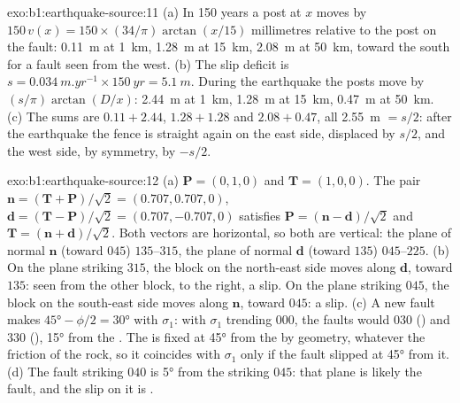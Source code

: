 \begin{solution}{exo:b1:earthquake-source:11}
(a) In 150 years a post at $x$ moves by $150\,v(x) = 150\times(34/\pi)
\arctan(x/15)$ millimetres relative to the post on the fault: \qty{0.11}{m} at
\qty{1}{km}, \qty{1.28}{m} at \qty{15}{km}, \qty{2.08}{m} at \qty{50}{km},
toward the south for a  fault seen from the west. (b) The slip deficit is
$s = \qty{0.034}{m.yr^{-1}}\times\qty{150}{yr} = \qty{5.1}{m}$. During the
earthquake the posts move by $(s/\pi)\arctan(D/x)$: \qty{2.44}{m} at
\qty{1}{km}, \qty{1.28}{m} at \qty{15}{km}, \qty{0.47}{m} at \qty{50}{km}.
(c) The sums are $0.11 + 2.44$, $1.28 + 1.28$ and $2.08 + 0.47$, all
\qty{2.55}{m} $= s/2$: after the earthquake the fence is straight again on the
east side, displaced by $s/2$, and the west side, by symmetry, by $-s/2$.
\end{solution}

\begin{solution}{exo:b1:earthquake-source:12}
(a) $\mathbf P = (0, 1, 0)$ and $\mathbf T = (1, 0, 0)$. The pair
$\mathbf n = (\mathbf T + \mathbf P)/\sqrt2 = (0.707, 0.707, 0)$,
$\mathbf d = (\mathbf T - \mathbf P)/\sqrt2 = (0.707, -0.707, 0)$ satisfies
$\mathbf P = (\mathbf n - \mathbf d)/\sqrt2$ and $\mathbf T = (\mathbf n +
\mathbf d)/\sqrt2$. Both vectors are horizontal, so both  are
vertical: the plane of normal $\mathbf n$ (toward $045$)  $135$--$315$,
the plane of normal $\mathbf d$ (toward $135$)  $045$--$225$. (b) On the
plane striking $315$, the block on the north-east side moves along $\mathbf d$,
toward $135$: seen from the other block, to the right, a  slip. On the
plane striking $045$, the block on the south-east side moves along $\mathbf n$,
toward $045$: a  slip. (c) A new fault makes $\ang{45} - \phi/2 =
\ang{30}$ with $\sigma_1$: with $\sigma_1$ trending $000$, the faults would
 $030$ () and $330$ (), \ang{15} from the .
The  is fixed at \ang{45} from the  by geometry, whatever the
friction of the rock, so it coincides with $\sigma_1$ only if the fault slipped
at \ang{45} from it. (d) The fault striking $040$ is \ang{5} from the 
striking $045$: that plane is likely the fault, and the slip on it is
.
\end{solution}

